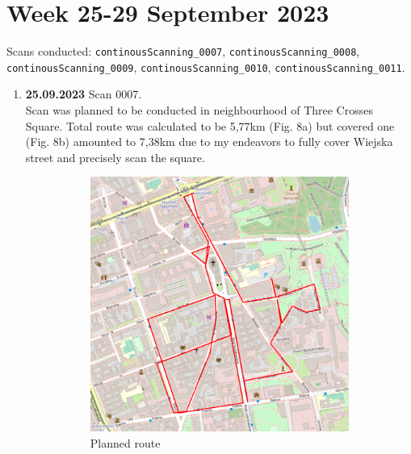 \documentclass[a4paper,12pt]{book}
\begin{document}
\section{Week 25-29 September 2023} 
Scans conducted: \verb|continousScanning_0007|, \verb|continousScanning_0008|, \verb|continousScanning_0009|, \verb|continousScanning_0010|, \verb|continousScanning_0011|.\\
\begin{enumerate}
	\item \textbf{25.09.2023} Scan 0007. \\
	Scan was planned to be conducted in neighbourhood of Three Crosses Square. Total route was calculated to be 5,77km (Fig. 8a) but covered one (Fig. 8b) amounted to 7,38km due to my endeavors to fully cover Wiejska street and precisely scan the square.
	\begin{figure}[H]
		\centering
		\begin{subfigure}{.75\textwidth}
			\centering
			\includegraphics[width=1\linewidth]{route_p7}
			\caption{Planned route}
			\label{fig:a7}
		\end{subfigure}%
		\linebreak
		\begin{subfigure}{.75\textwidth}
			\centering

\end{subfigure}
\end{figure}
\end{enumerate}
\end{document}
